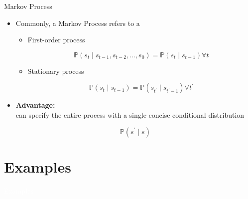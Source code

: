 \documentclass[11pt,table]{beamer}
\begin{document}
\begin{frame}{Markov Process}
\vspace{-5mm}
\begin{itemize}
    \item  Commonly, a Markov Process refers to a
\begin{itemize}
     
 \item First-order process

$$
\mathbb{P}\left(s_{t} \mid s_{t-1}, s_{t-2}, \ldots, s_{0}\right)=\mathbb{P}\left(s_{t} \mid s_{t-1}\right) \forall t
$$
\item  Stationary process

$$
\mathbb{P}\left(s_{t} \mid s_{t-1}\right)=\mathbb{P}\left(s_{t^{\prime}} \mid s_{t^{\prime}-1}\right) \forall t^{\prime}
$$
\end{itemize}
\item   \textbf{Advantage:}\\ can specify the entire process with a single concise conditional distribution

$$
\mathbb{P}\left(s^{\prime} \mid s\right)
$$
\end{itemize}
    
\end{frame}


\section{Examples}
{
\begin{frame}
\centering
\Huge
\textcolor{white}{Examples}
\thispagestyle{empty}
\end{frame}
}
\end{document}
